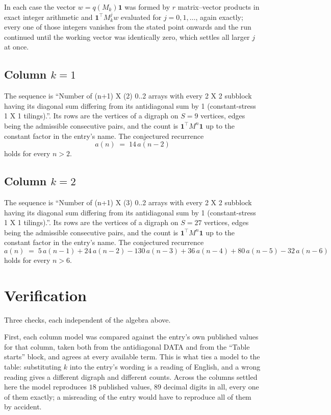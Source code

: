 \documentclass[11pt,a4paper]{article}
\theoremstyle{plain}
\theoremstyle{definition}
\begin{document}
In each case the vector $w=q(M_k)\mathbf{1}$ was formed by $r$ matrix--vector products in
exact integer arithmetic and $\mathbf{1}^{\!\top}M_k^{j}w$ evaluated for $j=0,1,\dots$,
again exactly; every one of those integers vanishes from the stated point onwards and the run
continued until the working vector was identically zero, which settles all larger $j$ at once.

\subsection*{Column $k=1$}
The sequence is ``Number of (n+1) X (2) 0..2 arrays with every 2 X 2 subblock having its diagonal sum differing from its antidiagonal sum by 1 (constant-stress 1 X 1 tilings).''. Its rows are the vertices of a digraph on
$S=9$ vertices, edges being the admissible consecutive pairs, and the count is
$\mathbf{1}^{\!\top}M^{n}\mathbf{1}$ up to the constant factor in the entry's name.
The conjectured recurrence
\[
a(n)\;=\;14\,a(n-2)
\]
holds for every $n>2$.

\subsection*{Column $k=2$}
The sequence is ``Number of (n+1) X (3) 0..2 arrays with every 2 X 2 subblock having its diagonal sum differing from its antidiagonal sum by 1 (constant-stress 1 X 1 tilings).''. Its rows are the vertices of a digraph on
$S=27$ vertices, edges being the admissible consecutive pairs, and the count is
$\mathbf{1}^{\!\top}M^{n}\mathbf{1}$ up to the constant factor in the entry's name.
The conjectured recurrence
\[
a(n)\;=\;5\,a(n-1) + 24\,a(n-2) - 130\,a(n-3) + 36\,a(n-4) + 80\,a(n-5) - 32\,a(n-6)
\]
holds for every $n>6$.

\section{Verification}

Three checks, each independent of the algebra above.

First, each column model was compared against the entry's own published values for that
column, taken both from the antidiagonal DATA and from the ``Table starts'' block, and agrees
at every available term. This is what ties a model to the table: substituting $k$ into the
entry's wording is a reading of English, and a wrong reading gives a different digraph and
different counts. Across the columns settled here the model reproduces $18$ published
values, $89$ decimal digits in all, every one of them exactly; a misreading of the entry
would have to reproduce all of them by accident.
\end{document}
